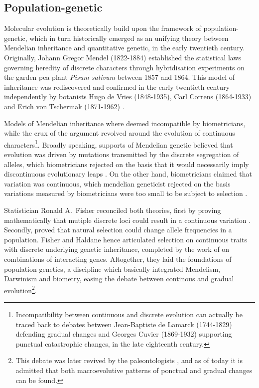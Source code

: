\subsection{Population-genetic}
Molecular evolution is theoretically build upon the framework of population-genetic, which in turn historically emerged as an unifying theory between Mendelian inheritance and quantitative genetic, in the early twentieth century.
Originally, Johann Gregor Mendel (1822-1884) established the statistical laws governing heredity of discrete characters through  hybridisation experiments on the garden pea plant \textit{Pisum sativum} between 1857 and 1864.
This model of inheritance was rediscovered and confirmed in the early twentieth century independently by botanists Hugo de Vries (1848-1935), Carl Correns (1864-1933) and Erich von Tschermak (1871-1962) \citep{dunn2003gregor}.

Models of Mendelian inheritance where deemed incompatible by biometricians, while the crux of the argument revolved around the evolution of continuous characters\footnote{Incompatibility between continuous and discrete evolution can actually be traced back to debates between Jean-Baptiste de Lamarck (1744-1829) defending gradual changes and Georges Cuvier (1869-1932) supporting punctual catastrophic changes, in the late eighteenth century.}.
Broadly speaking, supports of Mendelian genetic believed that evolution was driven by mutations transmitted by the discrete segregation of alleles, which biometricians rejected on the basis that it would necessarily imply discontinuous evolutionary leaps \citep{bowler2003evolution}.
On the other hand, biometricians claimed that variation was continuous, which mendelian geneticist rejected on the basis variations measured by biometricians were too small to be subject to selection \citep{provine2001origins}.

Statistician Ronald A.\ Fisher reconciled both theories, first by proving mathematically that mutiple discrete loci could result in a continuous variation \citep{fisher1919xv}.
Secondly, \citet{fisher1930genetical, haldane1932causes} proved that natural selection could change \gls{allele} frequencies in a population. 
Fisher and Haldane hence articulated selection on continuous traits with discrete underlying genetic inheritance, completed by the work of \citet{wright1932roles} on combinations of interacting genes.
Altogether, they laid the foundations of population genetics, a discipline which basically integrated Mendelism, Darwinism and biometry, easing the debate between continous and gradual evolution\footnote{This debate was later revived by the paleontologists \citet*{Gould1972}, and as of today it is admitted that both macroevolutive patterns of ponctual and gradual changes can be found.}.

